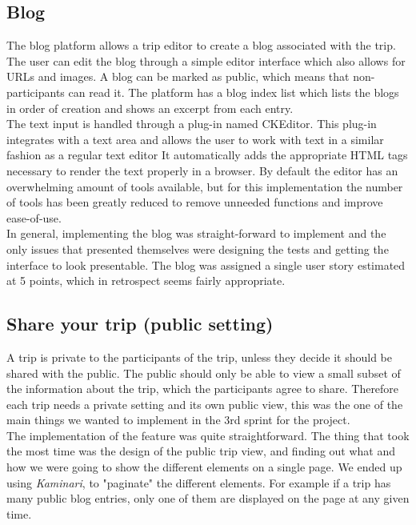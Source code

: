 \documentclass[a4paper]{article}
\begin{document}
\subsection{Blog}
The blog platform allows a trip editor to create a blog associated with the trip. The user can edit the blog through a simple editor interface which also allows for URLs and images. A blog can be marked as public, which means that non-participants can read it. The platform has a blog index list which lists the blogs in order of creation and shows an excerpt from each entry.\\

\noindent
The text input is handled through a plug-in named CKEditor\cite{CKEditor}. This plug-in integrates with a text area and allows the user to work with text in a similar fashion as a regular text editor It automatically adds the appropriate HTML tags necessary to render the text properly in a browser. By default the editor has an overwhelming amount of tools available, but for this implementation the number of tools has been greatly reduced to remove unneeded functions and improve ease-of-use.\\

\noindent
In general, implementing the blog was straight-forward to implement and the only issues that presented themselves were designing the tests and getting the interface to look presentable. The blog was assigned a single user story estimated at 5 points, which in retrospect seems fairly appropriate.

\subsection{Share your trip (public setting)}
A trip is private to the participants of the trip, unless they decide it should be shared with the public. The public should only be able to view a small subset of the information about the trip, which the participants agree to share. Therefore each trip needs a private setting and its own public view, this was the one of the main things we wanted to implement in the 3rd sprint for the project. \\

\noindent
The implementation of the feature was quite straightforward. The thing that took the most time was the design of the public trip view, and finding out what and how we were going to show the different elements on a single page. We ended up using \emph{Kaminari}\cite{kaminari}, to "paginate" the different elements. For example if a trip has many public blog entries, only one of them are displayed on the page at any given time. 
\end{document}
